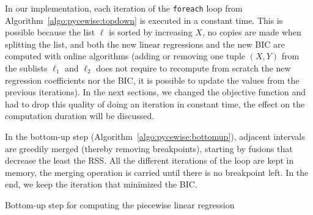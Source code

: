                 In our implementation, each iteration of the \texttt{foreach} loop from
                Algorithm~\ref{algo:pycewise:topdown} is executed in a constant time. This is possible because the list
                \(\ell\) is sorted by increasing \(X\), no copies are made when splitting the list, and both the new linear
                regressions and the new BIC are computed with online algorithms (\ie adding or removing one tuple
                \((X,Y)\) from the sublists \(\ell_1\) and \(\ell_2\) does not require to recompute from scratch the new
                regression coefficients nor the BIC, it is possible to update the values from the previous iterations).
                In the next sections, we changed the objective function and had to drop this quality of doing an
                iteration in constant time, the effect on the computation duration will be discussed.

                In the bottom-up step (Algorithm~\ref{algo:pycewise:bottomup}), adjacent intervals are greedily merged
                (thereby removing breakpoints), starting by fusions that decrease the least the RSS. All the different
                iterations of the loop are kept in memory, the merging operation is carried until there is no breakpoint
                left. In the end, we keep the iteration that minimized the BIC.
                \begin{algorithm}
                    \DontPrintSemicolon
                    \caption{Bottom-up step for computing the piecewise linear regression}
                    \label{algo:pycewise:bottomup}
                \end{algorithm}

